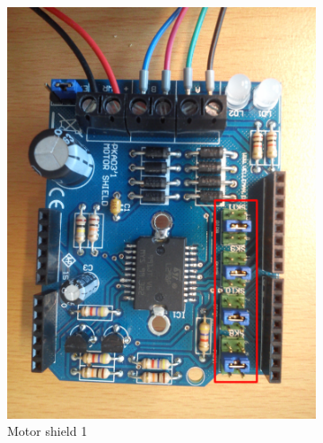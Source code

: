 \documentclass[a4paper,10pt]{article}
\begin{document}
\begin{figure}
\begin{subfigure}[b]{0.32\textwidth}
      \includegraphics[width=\textwidth]{../figures/motor1.jpg}
        \caption{Motor shield 1}
    \end{subfigure}
    \begin{subfigure}[b]{0.32\textwidth}

\end{subfigure}
\end{figure}
\end{document}
